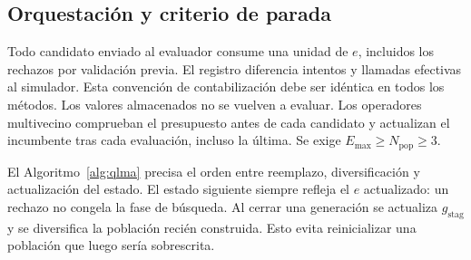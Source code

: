 \documentclass[11pt,a4paper]{article}
\newcommand{\Emax}{E_{\max}}
\newcommand{\gstag}{g_{\mathrm{stag}}}
\begin{document}
\subsection{Orquestación y criterio de parada}
Todo candidato enviado al evaluador consume una unidad de $e$, incluidos los rechazos por validación previa. El registro diferencia intentos y llamadas efectivas al simulador. Esta convención de contabilización debe ser idéntica en todos los métodos. Los valores almacenados no se vuelven a evaluar. Los operadores multivecino comprueban el presupuesto antes de cada candidato y actualizan el incumbente tras cada evaluación, incluso la última. Se exige $\Emax\geq N_{\mathrm{pop}}\geq3$.

El Algoritmo~\ref{alg:qlma} precisa el orden entre reemplazo, diversificación y actualización del estado. El estado siguiente siempre refleja el $e$ actualizado: un rechazo no congela la fase de búsqueda. Al cerrar una generación se actualiza $\gstag$ y se diversifica la población recién construida. Esto evita reinicializar una población que luego sería sobrescrita.
\end{document}
